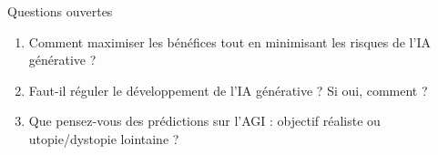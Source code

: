 \begin{frame}{Questions ouvertes}

\begin{enumerate}
    \item Comment maximiser les bénéfices tout en minimisant les risques de l'IA générative ?

    \vspace{0.3cm}
    \item Faut-il réguler le développement de l'IA générative ? Si oui, comment ?

    \vspace{0.3cm}
    \item Que pensez-vous des prédictions sur l'AGI : objectif réaliste ou utopie/dystopie lointaine ?
\end{enumerate}

\end{frame}

